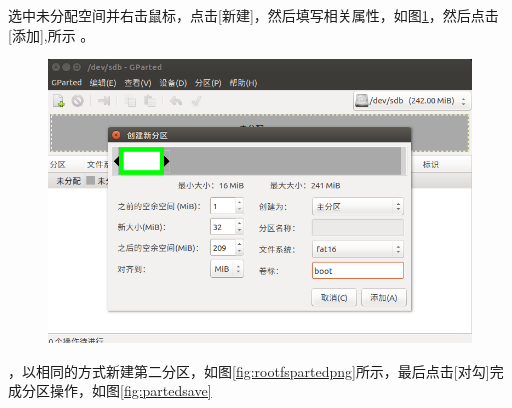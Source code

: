 选中未分配空间并右击鼠标，点击[新建]，然后填写相关属性，如图\ref{fig:bootpartedpng}，然后点击[添加],所示
。
\begin{figure}[htbp]
	\centering
	\includegraphics[width=1\linewidth]{chapter2/img/bootpartedpng}
	\caption{}
	\label{fig:bootpartedpng}
\end{figure}
，以相同的方式新建第二分区，如图\ref{fig:rootfspartedpng}所示，最后点击[对勾]完成分区操作，如图\ref{fig:partedsave}
